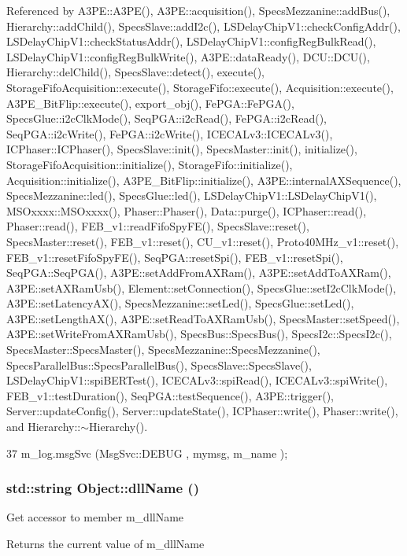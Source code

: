 Referenced by A3PE::A3PE(), A3PE::acquisition(), SpecsMezzanine::addBus(), Hierarchy::addChild(), SpecsSlave::addI2c(), LSDelayChipV1::checkConfigAddr(), LSDelayChipV1::checkStatusAddr(), LSDelayChipV1::configRegBulkRead(), LSDelayChipV1::configRegBulkWrite(), A3PE::dataReady(), DCU::DCU(), Hierarchy::delChild(), SpecsSlave::detect(), execute(), StorageFifoAcquisition::execute(), StorageFifo::execute(), Acquisition::execute(), A3PE\_\-BitFlip::execute(), export\_\-obj(), FePGA::FePGA(), SpecsGlue::i2cClkMode(), SeqPGA::i2cRead(), FePGA::i2cRead(), SeqPGA::i2cWrite(), FePGA::i2cWrite(), ICECALv3::ICECALv3(), ICPhaser::ICPhaser(), SpecsSlave::init(), SpecsMaster::init(), initialize(), StorageFifoAcquisition::initialize(), StorageFifo::initialize(), Acquisition::initialize(), A3PE\_\-BitFlip::initialize(), A3PE::internalAXSequence(), SpecsMezzanine::led(), SpecsGlue::led(), LSDelayChipV1::LSDelayChipV1(), MSOxxxx::MSOxxxx(), Phaser::Phaser(), Data::purge(), ICPhaser::read(), Phaser::read(), FEB\_\-v1::readFifoSpyFE(), SpecsSlave::reset(), SpecsMaster::reset(), FEB\_\-v1::reset(), CU\_\-v1::reset(), Proto40MHz\_\-v1::reset(), FEB\_\-v1::resetFifoSpyFE(), SeqPGA::resetSpi(), FEB\_\-v1::resetSpi(), SeqPGA::SeqPGA(), A3PE::setAddFromAXRam(), A3PE::setAddToAXRam(), A3PE::setAXRamUsb(), Element::setConnection(), SpecsGlue::setI2cClkMode(), A3PE::setLatencyAX(), SpecsMezzanine::setLed(), SpecsGlue::setLed(), A3PE::setLengthAX(), A3PE::setReadToAXRamUsb(), SpecsMaster::setSpeed(), A3PE::setWriteFromAXRamUsb(), SpecsBus::SpecsBus(), SpecsI2c::SpecsI2c(), SpecsMaster::SpecsMaster(), SpecsMezzanine::SpecsMezzanine(), SpecsParallelBus::SpecsParallelBus(), SpecsSlave::SpecsSlave(), LSDelayChipV1::spiBERTest(), ICECALv3::spiRead(), ICECALv3::spiWrite(), FEB\_\-v1::testDuration(), SeqPGA::testSequence(), A3PE::trigger(), Server::updateConfig(), Server::updateState(), ICPhaser::write(), Phaser::write(), and Hierarchy::$\sim$Hierarchy().


\begin{DoxyCode}
37 { m_log.msgSvc (MsgSvc::DEBUG   , mymsg, m_name ); }
\end{DoxyCode}
\hypertarget{classObject_a2e3947f2870094c332d7454117f3ec63}{
\subsubsection[{dllName}]{\setlength{\rightskip}{0pt plus 5cm}std::string Object::dllName ()}}
\label{classObject_a2e3947f2870094c332d7454117f3ec63}
Get accessor to member m\_\-dllName \begin{DoxyReturn}{Returns}
the current value of m\_\-dllName 
\end{DoxyReturn}


